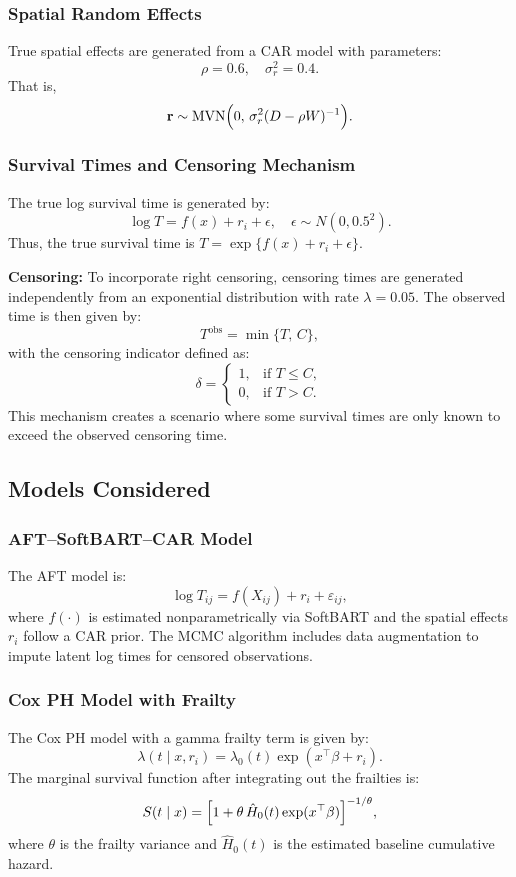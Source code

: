 \documentclass[useAMS,referee]{biom}
\begin{document}
\subsubsection{Spatial Random Effects}
True spatial effects are generated from a CAR model with parameters:
\[
\rho = 0.6, \quad \sigma_r^2 = 0.4.
\]
That is, 
\[
\mathbf{r} \sim \text{MVN}\Bigl(0, \, \sigma_r^2 (D-\rho W)^{-1}\Bigr).
\]

\subsubsection{Survival Times and Censoring Mechanism}
The true log survival time is generated by:
\[
\log T = f(x) + r_i + \epsilon, \quad \epsilon \sim N(0, 0.5^2).
\]
Thus, the true survival time is $T = \exp\{f(x) + r_i + \epsilon\}$.

\textbf{Censoring:} To incorporate right censoring, censoring times are generated independently from an exponential distribution with rate $\lambda = 0.05$. The observed time is then given by:
\[
T^{\text{obs}} = \min\{T,\, C\},
\]
with the censoring indicator defined as:
\[
\delta = \begin{cases} 1, & \text{if } T \le C, \\ 0, & \text{if } T > C. \end{cases}
\]
This mechanism creates a scenario where some survival times are only known to exceed the observed censoring time.

\subsection{Models Considered}
\subsubsection{AFT--SoftBART--CAR Model}
The AFT model is:
\[
\log T_{ij} = f(X_{ij}) + r_i + \varepsilon_{ij},
\]
where $f(\cdot)$ is estimated nonparametrically via SoftBART and the spatial effects $r_i$ follow a CAR prior. The MCMC algorithm includes data augmentation to impute latent log times for censored observations.

\subsubsection{Cox PH Model with Frailty}
The Cox PH model with a gamma frailty term is given by:
\[
\lambda(t\mid x, r_i) = \lambda_0(t)\exp(x^\top\beta + r_i).
\]
The marginal survival function after integrating out the frailties is:
\[
S(t\mid x) = \Bigl[1+\theta\, \hat{H}_0(t)\exp(x^\top\beta)\Bigr]^{-1/\theta},
\]
where $\theta$ is the frailty variance and $\hat{H}_0(t)$ is the estimated baseline cumulative hazard.
\end{document}
